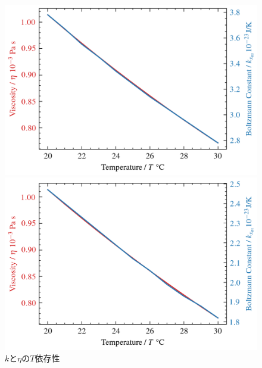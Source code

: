 \begin{figure}[htbp]
    \centering
    \begin{minipage}[b]{0.45\linewidth}
        \centering
        \includegraphics[keepaspectratio, width=\linewidth]{src/figures/k-n-relation/k-x-n-relation.png}
    \end{minipage}
    \begin{minipage}[b]{0.45\linewidth}
        \centering
        \includegraphics[width=\linewidth]{src/figures/k-n-relation/k-y-n-relation.png}
    \end{minipage}
    \caption{$k$と$\eta$の$T$依存性} \label{fig:k-n-relation}
\end{figure}
